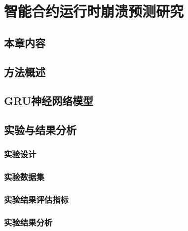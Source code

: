 \chapter{智能合约运行时崩溃预测研究}
\section{本章内容}
\section{方法概述}
\section{GRU神经网络模型}
\section{实验与结果分析}
\subsection{实验设计}
\subsection{实验数据集}
\subsection{实验结果评估指标}
\subsection{实验结果分析}
